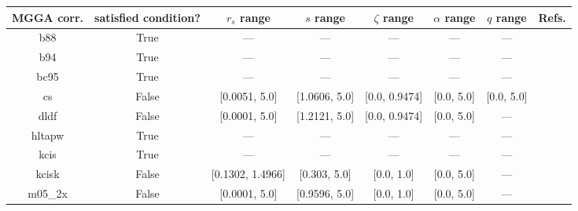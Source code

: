 \begin{tabular}{|c|c|c|c|c|c|c|l|}
\hline
   MGGA corr. &  satisfied condition? &      $r_s$ range &        $s$ range &    $\zeta$ range & $\alpha$ range & $q$ range  &                                                                              Refs. \\ \hline
          b88 &                  True &              --- &              --- &              --- &            --- &        --- &                                                              \cite{Becke1988_1053} \\ \hline
          b94 &                  True &              --- &              --- &              --- &            --- &        --- &                                                               \cite{Becke1994_625} \\ \hline
         bc95 &                  True &              --- &              --- &              --- &            --- &        --- &                                                              \cite{Becke1996_1040} \\ \hline
           cs &                 False &    [0.0051, 5.0] &    [1.0606, 5.0] &    [0.0, 0.9474] &     [0.0, 5.0] & [0.0, 5.0] &                                                   \cite{Colle1975_329,Lee1988_785} \\ \hline
         dldf &                 False &    [0.0001, 5.0] &    [1.2121, 5.0] &    [0.0, 0.9474] &     [0.0, 5.0] &        --- &                                                           \cite{Pernal2009_263201} \\ \hline
       hltapw &                  True &              --- &              --- &              --- &            --- &        --- &                                                             \cite{Lehtola2021_943} \\ \hline
         kcis &                  True &              --- &              --- &              --- &            --- &        --- & \cite{Rey1998_581,Krieger1999_463,Krieger2001_48,Kurth1999_889,Toulouse2002_10465} \\ \hline
        kcisk &                 False & [0.1302, 1.4966] &     [0.303, 5.0] &       [0.0, 1.0] &     [0.0, 5.0] &        --- & \cite{Rey1998_581,Krieger1999_463,Krieger2001_48,Kurth1999_889,Toulouse2002_10465} \\ \hline
      m05\_2x &                 False &    [0.0001, 5.0] &    [0.9596, 5.0] &       [0.0, 1.0] &     [0.0, 5.0] &        --- &                                                                \cite{Zhao2006_364} \\ \hline

\end{tabular}
